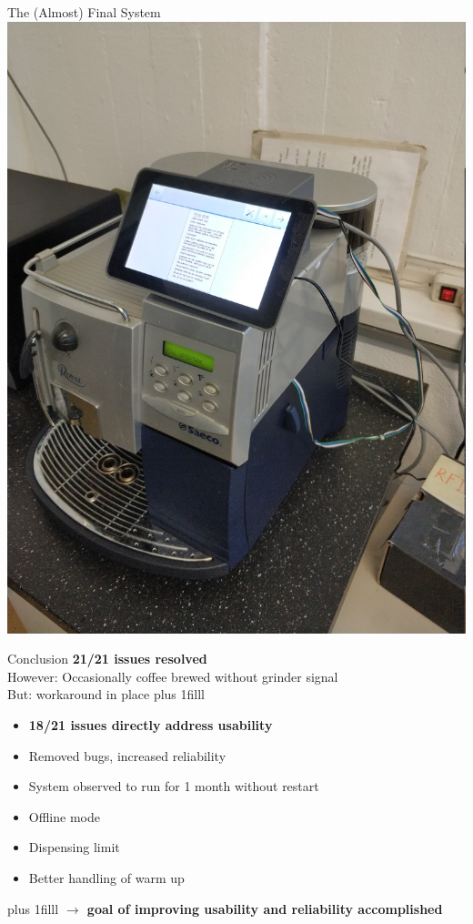 \documentclass[t]{beamer}
\newcommand{\btVFill}{\vskip0pt plus 1filll}
\begin{document}
\begin{frame}{The (Almost) Final System}
    \includegraphics[trim={0cm 48cm 2cm 29cm},clip,width=\textwidth]{./images/final-picture.jpg}
\end{frame}

\begin{frame}{Conclusion}
    \textbf{21/21 issues resolved}\\
    However: Occasionally coffee brewed without grinder signal \\ But: workaround in place
    \btVFill
    \begin{itemize}
        \item \textbf{18/21 issues directly address usability}
        \item Removed bugs, increased reliability
        \item System observed to run for 1 month without restart
        \item Offline mode
        \item Dispensing limit
        \item Better handling of warm up
    \end{itemize}
    \vspace*{1em}
    \btVFill
    \textbf{$\rightarrow$ goal of improving usability and reliability accomplished}
\end{frame}
\end{document}
